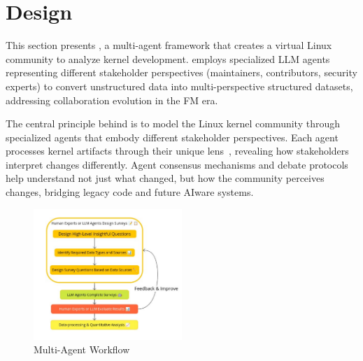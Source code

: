 \section{\sys Design}
\label{sec:design}

This section presents \sys, a multi-agent framework that creates a virtual Linux community to analyze kernel development. \sys employs specialized LLM agents representing different stakeholder perspectives (maintainers, contributors, security experts) to convert unstructured data into multi-perspective structured datasets, addressing collaboration evolution in the FM era.

The central principle behind \sys is to model the Linux kernel community through specialized agents that embody different stakeholder perspectives. Each agent processes kernel artifacts through their unique lens~\cite{ji2023survey}, revealing how stakeholders interpret changes differently. Agent consensus mechanisms and debate protocols help understand not just what changed, but how the community perceives changes, bridging legacy code and future AIware systems.

\begin{figure}[t]
    \centering
    \includegraphics[width=0.5\textwidth]{workflow.pdf}
    \caption{\sys Multi-Agent Workflow}
    \label{fig:workflow}
\end{figure}

